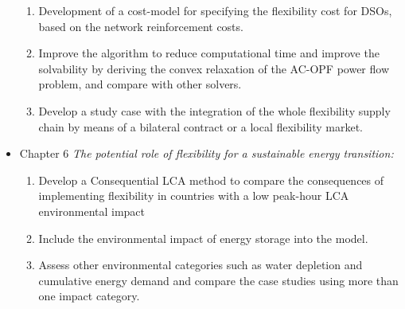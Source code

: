 \begin{itemize}
\begin{enumerate}
		\item Development of a cost-model for specifying the flexibility cost for DSOs, based on the network reinforcement costs. 
		\item Improve the algorithm to reduce computational time and improve the solvability by deriving the convex relaxation of the AC-OPF power flow problem, and compare with other solvers. 
		\item Develop a study case with the integration of the whole flexibility supply chain by means of a bilateral contract or a local flexibility market. 
	\end{enumerate}
\item Chapter 6 \textit{The potential role of flexibility for a sustainable energy transition:} 
	\begin{enumerate}
		\item Develop a Consequential LCA method to compare the consequences of implementing flexibility in countries with a low peak-hour LCA environmental impact
		\item Include the environmental impact of energy storage into the model. 
		\item Assess other environmental categories such as water depletion and cumulative energy demand and compare the case studies using more than one impact category. 
	\end{enumerate}
\end{itemize}
